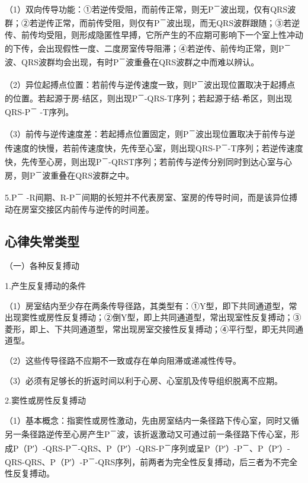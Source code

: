 （1）双向传导功能：①若逆传受阻，而前传正常，则无P\textsuperscript{－}波出现，仅有QRS波群；②若逆传正常，而前传受阻，则仅有P\textsuperscript{－}波出现，而无QRS波群跟随；③若逆传、前传均受阻，则形成隐匿性早搏，它所产生的不应期可影响下一个室上性冲动的下传，会出现假性一度、二度房室传导阻滞；④若逆传、前传均正常，则P\textsuperscript{－}波、QRS波群均会出现，有时P\textsuperscript{－}波重叠在QRS波群之中而难以辨认。

（2）异位起搏点位置：若前传与逆传速度一致，则P\textsuperscript{－}波出现位置取决于起搏点的位置。若起源于房-结区，则出现P\textsuperscript{－}-QRS-T序列；若起源于结-希区，则出现QRS-P\textsuperscript{－} -T序列。

（3）前传与逆传速度差：若起搏点位置固定，则P\textsuperscript{－}波出现位置取决于前传与逆传速度的快慢，若前传速度快，先传至心室，则出现QRS-P\textsuperscript{－}-T序列；若逆传速度快，先传至心房，则出现P\textsuperscript{－}-QRST序列；若前传与逆传分别同时到达心室与心房，则P\textsuperscript{－}波重叠在QRS波群之中。

5.P\textsuperscript{－} -R间期、R-P\textsuperscript{－}间期的长短并不代表房室、室房的传导时间，而是该异位搏动在房室交接区内前传与逆传的时间差。

\protect\hypertarget{text00021.htmlux5cux23subid239}{}{}

\subsection{心律失常类型}

（一）各种反复搏动

1.产生反复搏动的条件

（1）房室结内至少存在两条传导径路，其类型有：①Y型，即下共同通道型，常出现窦性或房性反复搏动；②倒Y型，即上共同通道型，常出现室性反复搏动；③菱形，即上、下共同通道型，常出现房室交接性反复搏动；④平行型，即无共同通道型。

（2）这些传导径路不应期不一致或存在单向阻滞或递减性传导。

（3）必须有足够长的折返时间以利于心房、心室肌及传导组织脱离不应期。

2.窦性或房性反复搏动

（1）基本概念：指窦性或房性激动，先由房室结内一条径路下传心室，同时又循另一条径路逆传至心房产生P\textsuperscript{－}波，该折返激动又可通过前一条径路下传心室，形成P（P′）-QRS-P\textsuperscript{－}-QRS、P（P′）-QRS-P\textsuperscript{－}序列或呈P（P′）-P\textsuperscript{－}、P（P′）-QRS-QRS、P（P′）-P\textsuperscript{－}-QRS序列，前两者为完全性反复搏动，后三者为不完全性反复搏动。

